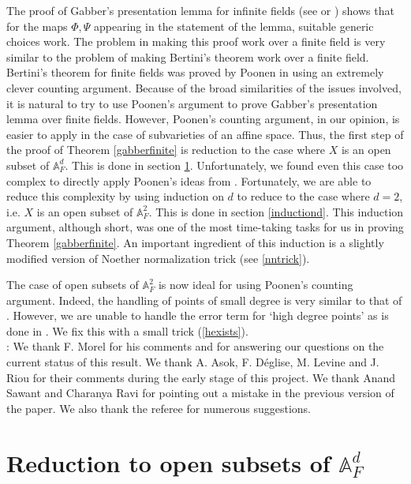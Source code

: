 \documentclass[10pt]{amsart}
\theoremstyle{plain}
\theoremstyle{definition}
\newcommand{\A}{{\mathbb A}}
\begin{document}
The proof of Gabber's presentation lemma for infinite fields (see  \cite[3.1]{gabber} or \cite[3.1]{chk}) shows that for the maps $\Phi,\Psi$ appearing in the statement of the lemma, suitable generic choices work.  The problem in making this proof work over a finite field is very similar to the problem of making Bertini's theorem work over a finite field. Bertini's theorem for finite fields  was proved by Poonen in \cite{poonen} using an extremely clever counting argument. Because of the broad similarities of the issues involved, it is natural to try to use Poonen's  argument to prove Gabber's presentation lemma over finite fields. However, Poonen's counting argument, in our opinion, is easier to apply in the case of subvarieties of an affine space. Thus, the first  step of the proof of Theorem \ref{gabberfinite} is reduction to the case where $X$ is an open subset of $\A^d_F$. This is done in section \ref{firstred}. Unfortunately, we found even this case too complex to directly apply Poonen's ideas from \cite{poonen}. Fortunately, we are able to reduce this complexity by using induction on $d$ to reduce to the case where $d=2$, i.e. $X$ is an open subset of $\A^2_F$. This is done in  section \ref{inductiond}. This induction argument, although short, was one of the most time-taking tasks for us in proving Theorem \ref{gabberfinite}.   An important ingredient of this induction is a slightly modified version of Noether normalization trick (see \ref{nntrick}).  

The case of open subsets of $\A^2_F$ is now ideal for using Poonen's counting argument. Indeed, the handling of points of small degree is very similar to that of \cite{poonen}. However, we are unable to handle the error term for `high degree points' as is done in \cite{poonen}. We fix this with a small trick (\ref{hexists}). \\


: We thank F. Morel for his comments and for answering our questions on the current status of this result.  We thank A. Asok, F. D\'eglise, M. Levine and J. Riou for their comments during the early stage of this project. We thank Anand Sawant and Charanya Ravi for pointing out a mistake in the previous version of the paper. We also thank the referee for numerous suggestions.

\section{Reduction to open subsets of $\A^d_F$}\label{firstred}
\end{document}
